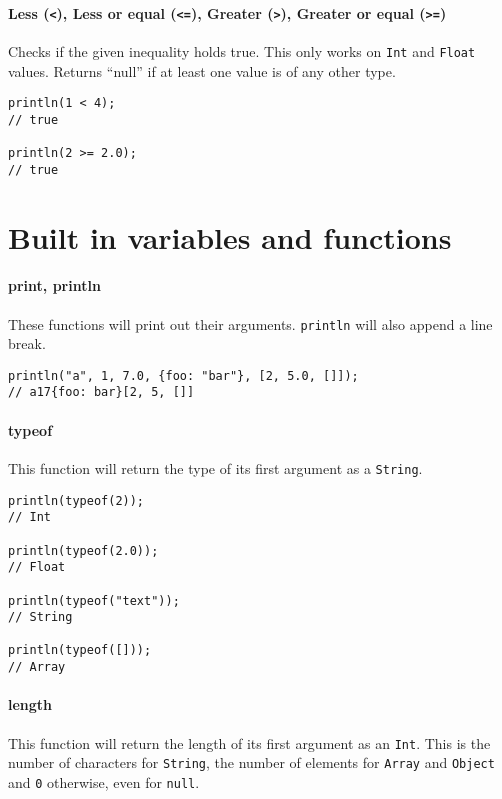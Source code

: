 \documentclass[a4paper, parskip, 10pt]{scrartcl}
\begin{document}
\paragraph{Less (\texttt{<}), Less or equal (\texttt{<=}), Greater
(\texttt{>}), Greater or equal (\texttt{>=})}
Checks if the given inequality holds true. This only works on \texttt{Int} and
\texttt{Float} values. Returns \enquote{null} if at least one value is of any
other type.

\begin{lstlisting}
println(1 < 4);
// true

println(2 >= 2.0);
// true
\end{lstlisting}

\section{Built in variables and functions}

\paragraph{print, println}
These functions will print out their arguments. \texttt{println} will also
append a line break.

\begin{lstlisting}
println("a", 1, 7.0, {foo: "bar"}, [2, 5.0, []]);
// a17{foo: bar}[2, 5, []]
\end{lstlisting}

\paragraph{typeof}
This function will return the type of its first argument as a \texttt{String}.

\begin{lstlisting}
println(typeof(2));
// Int

println(typeof(2.0));
// Float

println(typeof("text"));
// String

println(typeof([]));
// Array
\end{lstlisting}

\paragraph{length}
This function will return the length of its first argument as an \texttt{Int}.
This is the number of characters for \texttt{String}, the number of elements
for \texttt{Array} and \texttt{Object} and \texttt{0} otherwise, even for
\texttt{null}.
\end{document}
